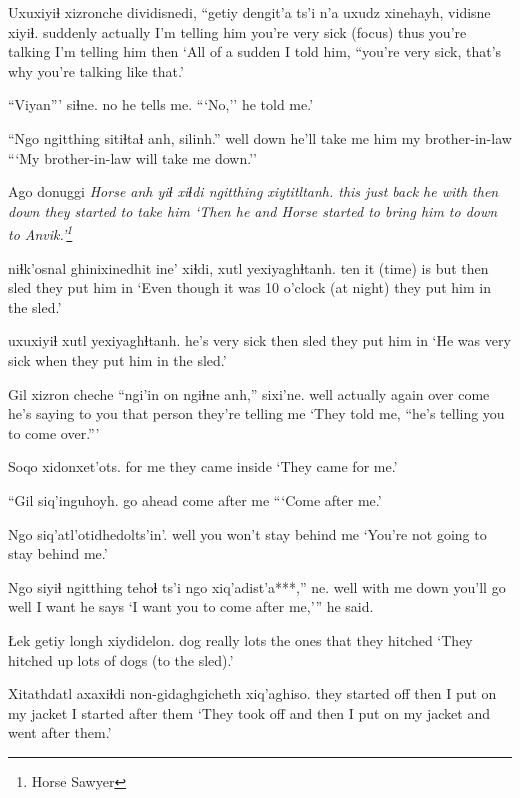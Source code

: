 \documentclass[12pt]{article}
\begin{document}
\gll Uxuxiyiɬ xizronche dividisnedi,       {``getiy dengit'a} ts'i n'a uxudz xinehayh, vidisne xiyiɬ. 
suddenly  actually       {I'm telling him} {you're very sick} {} {(focus)}  thus {you're talking} {I'm telling him} then 
\glt `All of a sudden I told him, ``you're very sick, that's why you're talking like that.'
\glend

\gll ``Viyan''' siɬne.
no {he tells me.}
\glt ```No,'' he told me.'
\glend

\gll ``Ngo ngitthing sitiɬtaɬ anh, silinh.''
well down {he'll take me} him {my brother-in-law}
\glt ```My brother-in-law will take me down.'' 
\glend

\gll Ago donuggi \em Horse \em anh yiɬ xiɬdi ngitthing xiytitltanh.
this {just back} {} he with then down {they started to take him}
\glt `Then he and Horse started to bring him to down to Anvik.'\footnote{Horse Sawyer}
\glend

 niɬk'osnal ghinixinedhit ine' xiɬdi, xutl yexiyaghɬtanh.
{}           ten        {it (time) is} but then  sled  {they put him in}
\glt `Even though it was 10 o'clock (at night) they put him in the sled.'
\glend

 uxuxiyiɬ xutl yexiyaghɬtanh.
{he's very sick}   then sled {they put him in}
\glt `He was very sick when they put him in the sled.'
\glend

\gll Gil xizron cheche ``ngi'in on ngiɬne anh,'' sixi'ne.
well actually again     over  come {he's saying to you} {that person} {they're telling me}
\glt `They told me, ``he's telling you to come over.'''
\glend

\gll Soqo xidonxet'ots. 
{for me} {they came inside}
\glt `They came for me.'
\glend

\gll ``Gil siq'inguhoyh. 
{go ahead} {come after me}
\glt ```Come after me.'
\glend

\gll Ngo {siq'atl'otidhedolts'in'. }
well {you won't stay behind me}
\glt `You're not going to stay behind me.'
\glend

\gll Ngo siyiɬ ngitthing tehoɬ ts'i ngo xiq'adist'a***,'' ne. 
well {with me} down {you'll go} {} well {I want} {he says}
\glt `I want you to come after me,''' he said.
\glend

\gll Łek getiy longh xiydidelon. 
dog really lots {the ones that they hitched}
\glt `They hitched up lots of dogs (to the sled).'
\glend

\gll Xitathdatl axaxiɬdi non-gidaghgicheth xiq'aghiso. 
{they started off} then {I put on my jacket} {I started after them}
\glt `They took off and then I put on my jacket and went after them.'
\glend
\end{document}

